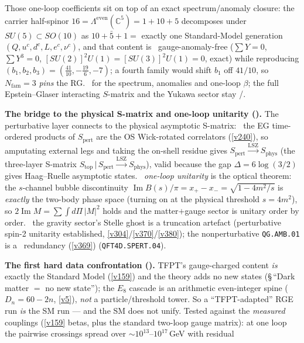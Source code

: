 \documentclass[11pt,a4paper]{article}
\newcommand{\Nfam}{N_{\mathrm{fam}}}
\begin{document}
\begin{keybox}
Those one-loop coefficients sit on top of an exact spectrum/anomaly closure: the carrier half-spinor
$16=\Lambda^{\mathrm{even}}(\mathbb C^5)=1{+}10{+}5$ decomposes under $SU(5)\subset SO(10)$ as $10{+}\bar5{+}1=$ exactly
one Standard-Model generation $(Q,u^c,d^c,L,e^c,\nu^c)$, and that content is \mE\ gauge-anomaly-free
($\sum Y=0$, $\sum Y^3=0$, $[SU(2)]^2U(1)=[SU(3)]^2U(1)=0$, exact) while reproducing $(b_1,b_2,b_3)=
(\tfrac{41}{10},-\tfrac{19}{6},-7)$; a fourth family would shift $b_1$ off $41/10$, so $\Nfam{=}3$ \emph{pins} the RG.
\mE\ for the spectrum, anomalies and one-loop $\beta$; the full Epstein--Glaser interacting $S$-matrix and the Yukawa
sector stay \mC/\mO.
\par\smallskip\noindent\textbf{The bridge to the physical S-matrix and one-loop unitarity ().}
The perturbative layer connects to the physical asymptotic S-matrix: \mE\ the EG time-ordered products of
$S_{\mathrm{pert}}$ are the OS Wick-rotated correlators (\vref{v240}), so amputating external legs and taking the
on-shell residue gives $S_{\mathrm{pert}}\xrightarrow{\mathrm{LSZ}}S_{\mathrm{phys}}$ (the three-layer S-matrix
$S_{\mathrm{top}}\,|\,S_{\mathrm{pert}}\xrightarrow{\mathrm{LSZ}}S_{\mathrm{phys}}$), valid because the gap
$\Delta{=}6\log(3/2)$ gives Haag--Ruelle asymptotic states. \mE\ \emph{one-loop unitarity} is the optical
theorem: the $s$-channel bubble discontinuity $\operatorname{Im}B(s)/\pi=x_+{-}x_-=\sqrt{1-4m^2/s}$ is
\emph{exactly} the two-body phase space (turning on at the physical threshold $s{=}4m^2$), so
$2\operatorname{Im}M=\sum\!\int d\Pi\,|M|^2$ holds and the matter$+$gauge sector is unitary order by order.
\mC\ the gravity sector's Stelle ghost is a truncation artefact (perturbative spin-2 unitarity established,
\vref{v304}/\vref{v370}/\vref{v380}); the nonperturbative \texttt{QG.AMB.01} is a \mC\ redundancy (\vref{v369})
(\texttt{QFT4D.SPERT.04}).
\par\smallskip\noindent\textbf{The first hard data confrontation
().} TFPT's gauge-charged content \emph{is} exactly the
Standard Model (\vref{v159}) and the theory adds no new states (\S\,``Dark matter $=$ no new state''); the
$E_8$ cascade is an arithmetic even-integer spine ($D_n{=}60{-}2n$, \vref{v5}), \emph{not} a
particle/threshold tower. So a ``TFPT-adapted'' RGE run \emph{is} the SM run --- and the SM does not unify.
Tested against the \emph{measured} couplings (\vref{v159} betas, plus the standard two-loop gauge matrix):
at one loop the pairwise crossings spread over ${\sim}10^{13}$--$10^{17}$\,GeV with residual

\end{keybox}
\end{document}
